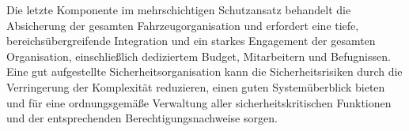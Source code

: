 Die letzte Komponente im mehrschichtigen Schutzansatz behandelt die Absicherung 
der gesamten Fahrzeugorganisation und erfordert eine tiefe, bereichsübergreifende 
Integration und ein starkes Engagement der gesamten Organisation, einschließlich 
dediziertem Budget, Mitarbeitern und Befugnissen. 
\newline
Eine gut aufgestellte Sicherheitsorganisation kann die Sicherheitsrisiken durch die 
Verringerung der Komplexität reduzieren, einen guten Systemüberblick bieten und für 
eine ordnungsgemäße Verwaltung aller sicherheitskritischen Funktionen und der 
entsprechenden Berechtigungsnachweise sorgen. 

